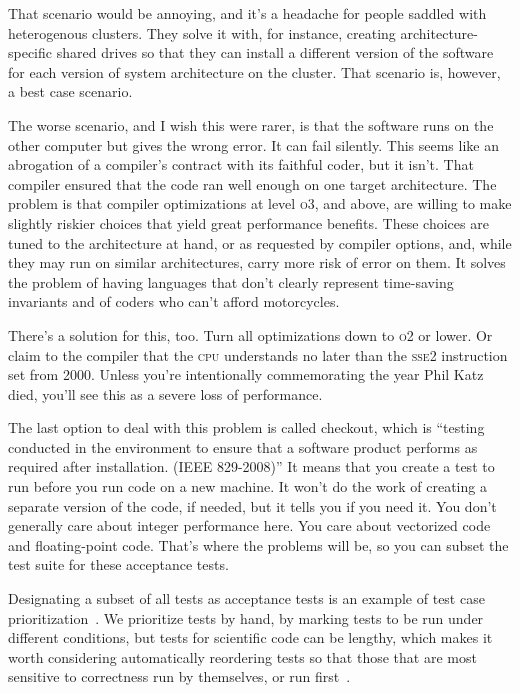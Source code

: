 \documentclass[fleqn,10pt]{olplainarticle}
\newcommand{\cpu}{\textsc{cpu}\xspace}
\begin{document}
That scenario would be annoying, and it's a headache for people
saddled with heterogenous clusters. They solve it with, for instance,
creating architecture-specific shared drives so that they can
install a different version of the software for each version of
system architecture on the cluster. That scenario is, however, a
best case scenario.

The worse scenario, and I wish this were rarer, is that the
software runs on the other computer but gives the wrong error.
It can fail silently. This seems like an abrogation of a compiler's
contract with its faithful coder, but it isn't. That compiler
ensured that the code ran well enough on one target architecture.
The problem is that compiler optimizations at level \textsc{o3}, and above,
are willing to make slightly riskier choices that yield great
performance benefits. These choices are tuned to the architecture
at hand, or as requested by compiler options, and, while they may
run on similar architectures, carry more risk of error on them.
It solves the problem of having languages
that don't clearly represent time-saving invariants and of coders
who can't afford motorcycles.

There's a solution for this, too. Turn all optimizations down
to \textsc{o2} or lower. Or claim to the compiler that the \cpu
understands no later than the \textsc{sse2} instruction set from 2000.
Unless you're intentionally commemorating the year Phil Katz died, you'll see
this as a severe loss of performance.

The last option to deal with this problem is called checkout,
which is ``testing conducted in the environment to ensure that a software product performs as required after installation. (IEEE 829-2008)'' It means that you create a test to run before you
run code on a new machine. It won't do the work of creating
a separate version of the code, if needed, but it tells you if
you need it. You don't generally care about integer performance
here. You care about vectorized code and floating-point code.
That's where the problems will be, so you can subset the test
suite for these acceptance tests.

Designating a subset of all tests as acceptance tests is an
example of test case prioritization~\cite{rothermel1999test}.
We prioritize tests by hand, by marking tests to be run under
different conditions, but tests for scientific code can be lengthy,
which makes it worth considering automatically reordering tests
so that those that are most sensitive to correctness run by 
themselves, or run first~\cite{yoo2012regression}.
\end{document}
